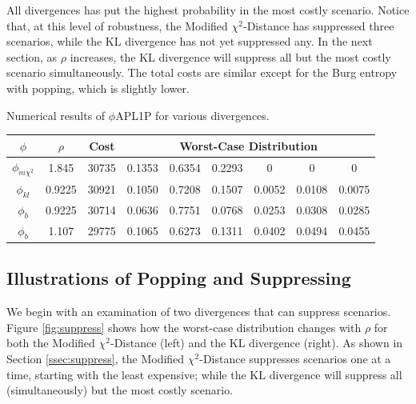 \documentclass[ijoc,letterpaper]{informs3} %
\begin{document}
All divergences has put the highest probability in the most costly scenario. 
Notice that, at this level of robustness, the Modified $\chi^2$-Distance has suppressed three scenarios, while the KL divergence has not yet suppressed any.
In the next section, as $\rho$ increases, the KL divergence will suppress all but the most costly scenario simultaneously. 
The total costs are similar except for the Burg entropy with popping, which is slightly lower.


\begin{table}
	\TABLE
	{
		Numerical results of $\phi$APL1P for various divergences.
		\label{tb:numerical_results}
	}
	{\begin{tabular}{cc|c|cccccc}
		$\phi$ & $\rho$ & Cost & \multicolumn{6}{c}{Worst-Case Distribution} \\
		\hline
		$\phi_{m\chi^2}$ &  1.845  & 30735 & 0.1353 & 0.6354 & 0.2293 & 0      & 0      & 0 \\
		$\phi_{kl}$      &  0.9225 & 30921 & 0.1050 & 0.7208 & 0.1507 & 0.0052 & 0.0108 & 0.0075 \\
		$\phi_b$         &  0.9225 & 30714 & 0.0636 & 0.7751 & 0.0768 & 0.0253 & 0.0308 & 0.0285 \\
		\hline
		$\phi_b$         &  1.107  & 29775 & 0.1065 & 0.6273 & 0.1311 & 0.0402 & 0.0494 & 0.0455
	\end{tabular}}
	{}
\end{table}

\subsection{Illustrations of Popping and Suppressing}
\label{ssec:numerical_pop_suppress}



We begin with an examination of two divergences that can suppress scenarios.
Figure \ref{fig:suppress} shows how the worst-case distribution changes with $\rho$ for both the Modified $\chi^2$-Distance (left) and the KL divergence (right).
As shown in Section \ref{ssec:suppress}, the Modified $\chi^2$-Distance suppresses scenarios one at a time, starting with the least expensive; while the KL divergence will suppress all (simultaneously) but the most costly scenario.
\end{document}
